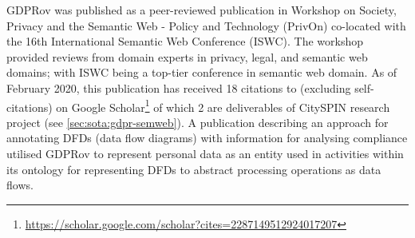 GDPRov was published \cite{pandit_modelling_2017} as a peer-reviewed publication in Workshop on Society, Privacy and the Semantic Web - Policy and Technology (PrivOn) co-located with the 16th International Semantic Web Conference (ISWC). The workshop provided reviews from domain experts in privacy, legal, and semantic web domains; with ISWC being a top-tier conference in semantic web domain.
As of February 2020, this publication has received 18 citations to (excluding self-citations) on Google Scholar\footnote{\url{https://scholar.google.com/scholar?cites=2287149512924017207}} of which 2 are deliverables of CitySPIN research project (see \autoref{sec:sota:gdpr-semweb}).
A publication describing an approach for annotating DFDs (data flow diagrams) with information for analysing compliance \cite{debruyneOntologyRepresentingAnnotating2019} utilised GDPRov to represent personal data as an entity used in activities within its ontology for representing DFDs to abstract processing operations as data flows.

